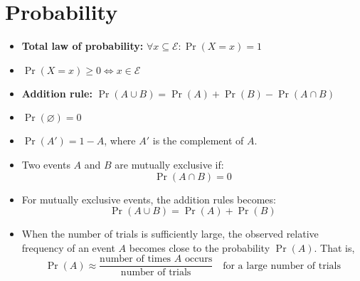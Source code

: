 \documentclass[12pt,a4paper,titlepage]{article}
\begin{document}
            \pagebreak
            
        \section{Probability}
            
            \begin{SummaryBox}[title=Basic laws of probability]
                \begin{itemize}[leftmargin=*]
                    \item \textbf{Total law of probability:} $\forall x \subseteq \mathcal{E}:\Pr(X=x) = 1$
                    \item $\Pr(X=x) \geq 0 \iff x \in \mathcal{E}$
                    \item \textbf{Addition rule:} $\Pr(A \cup B) = \Pr(A) + \Pr(B) - \Pr(A \cap B)$
                    \item $\Pr(\varnothing) = 0$
                    \item $\Pr(A') = 1 - A$, where $A'$ is the complement of $A$.
                \end{itemize}
            \end{SummaryBox}
            
            \begin{SummaryBox}[title=Mutually exclusive events]
                \begin{itemize}[leftmargin=*]
                    \item Two events $A$ and $B$ are mutually exclusive if:
                    \[
                        \Pr(A \cap B) = 0
                    \]
                    \item For mutually exclusive events, the addition rules becomes:
                    \[
                        \Pr(A \cup B) = \Pr(A) + \Pr(B)
                    \]
                \end{itemize}
            \end{SummaryBox}
            
            \begin{SummaryBox}[title=Probabilities from data]
                \begin{itemize}[leftmargin=*]
                    \item When the number of trials is sufficiently large, the observed relative frequency of an event $A$ becomes close to the probability $\Pr(A)$. That is,
                    \[
                        \Pr(A) \approx \frac{\text{number of times }A\text{  occurs}}{\text{number of trials}} \quad \text{for a large number of trials}
                    \]
                \end{itemize}
            \end{SummaryBox}
            
\end{document}
